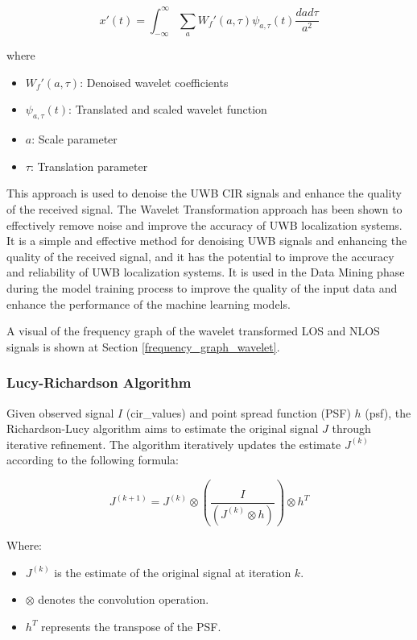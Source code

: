 \documentclass[
	article, %
	11pt, %
	draft, %
]{CSUniSchoolLabReport}
\begin{document}
\begin{equation}
x'(t) = \int_{-\infty}^{\infty} \sum_{a} W_f'(a, \tau) \psi_{a, \tau}(t) \frac{da d\tau}{a^2}
\end{equation}

where 

\begin{itemize}
  \item $W_f'(a, \tau)$: Denoised wavelet coefficients
  \item $\psi_{a, \tau}(t)$: Translated and scaled wavelet function
  \item $a$: Scale parameter
  \item $\tau$: Translation parameter
\end{itemize}

This approach is used to denoise the UWB CIR signals and enhance the quality of the received signal. The Wavelet Transformation approach has been shown to effectively remove noise and improve the accuracy of UWB localization systems. It is a simple and effective method for denoising UWB signals and enhancing the quality of the received signal, and it has the potential to improve the accuracy and reliability of UWB localization systems. It is used in the Data Mining phase during the model training process to improve the quality of the input data and enhance the performance of the machine learning models.

A visual of the frequency graph of the wavelet transformed LOS and NLOS signals is shown at Section \ref{frequency_graph_wavelet}.

\subsubsection{Lucy-Richardson Algorithm}

Given observed signal $I$ (cir\_values) and point spread function (PSF) $h$ (psf), the Richardson-Lucy algorithm aims to estimate the original signal $J$ through iterative refinement. The algorithm iteratively updates the estimate $J^{(k)}$ according to the following formula:

\begin{equation}
J^{(k+1)} = J^{(k)} \otimes \left( \frac{I}{(J^{(k)} \otimes h)} \right) \otimes h^T
\end{equation}

Where:
\begin{itemize}
    \item $J^{(k)}$ is the estimate of the original signal at iteration $k$.
    \item $\otimes$ denotes the convolution operation.
    \item $h^T$ represents the transpose of the PSF. 
\end{itemize}
\end{document}
